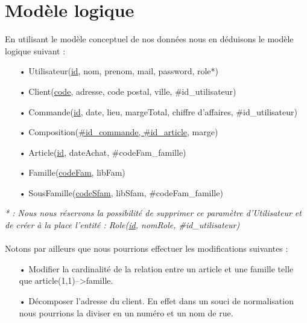 \section{Modèle logique}

En utilisant le modèle conceptuel de nos données nous en déduisons le modèle logique suivant :
\begin{enumerate}
\item[•] Utilisateur(\underline{id}, nom, prenom, mail, password, role*)
\item[•] Client(\underline{code}, adresse, code postal, ville, \#id\_utilisateur)
\item[•] Commande(\underline{id}, date, lieu, margeTotal, chiffre d’affaires, \#id\_utilisateur)
\item[•] Composition(\underline{\#id\_commande, \#id\_article}, marge)
\item[•] Article(\underline{id}, dateAchat, \#codeFam\_famille)
\item[•] Famille(\underline{codeFam}, libFam)
\item[•] SousFamille(\underline{codeSfam}, libSfam, \#codeFam\_famille) \\
\end{enumerate}

\noindent
\textit{* : Nous nous réservons la possibilité de supprimer ce paramètre d'Utilisateur et de créer à la place l'entité : Role(\underline{id}, nomRole, \#id\_utilisateur)} \\ \\

Notons par ailleurs que nous pourrions effectuer les modifications suivantes :
\begin{enumerate}
\item[•] Modifier la cardinalité de la relation entre un article et une famille telle que article(1,1)-->famille.
\item[•] Décomposer l'adresse du client. En effet dans un souci de normalisation nous pourrions la diviser en un numéro et un nom de rue.
\end{enumerate}